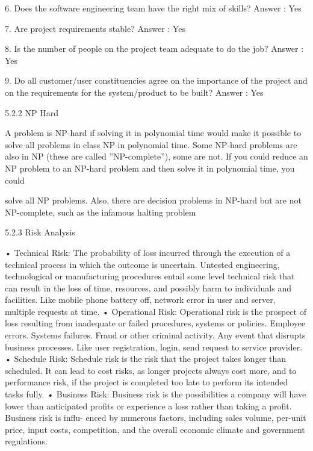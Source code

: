 \documentclass[oneside,a4paper,12pt]{report}
\begin{document}
{6.	Does the software engineering team have the right mix of skills?
Answer : Yes

7.	Are project requirements stable?
Answer : Yes

8.	Is the number of people on the project team adequate to do the job?
Answer : Yes

9.	Do all customer/user constituencies agree on the importance of the project and on the requirements for the system/product to be built?
Answer : Yes

5.2.2	NP Hard

A problem is NP-hard if solving it in polynomial time would make it possible to solve all problems in class NP in polynomial time. Some NP-hard problems are also in NP (these are called ”NP-complete”), some are not. If you could reduce an NP problem to an NP-hard problem and then solve it in polynomial time, you could

solve all NP problems. Also, there are decision problems in NP-hard but are not NP-complete, such as the infamous halting problem

5.2.3	Risk Analysis

•	Technical Risk:
The probability of loss incurred through the execution of a technical process in which the outcome is uncertain. Untested engineering, technological or manufacturing procedures entail some level technical risk that can result in the loss of time, resources, and possibly harm to individuals and facilities. Like mobile phone battery off, network error in user and server, multiple requests at time.
•	Operational Risk:
Operational risk is the prospect of loss resulting from inadequate or failed procedures, systems or policies. Employee errors. Systems failures. Fraud or other criminal activity. Any event that disrupts business processes. Like user registration, login, send request to service provider.
\newline
\newline
•	Schedule Risk:
Schedule risk is the risk that the project takes longer than scheduled. It can lead to cost risks, as longer projects always cost more, and to performance risk, if the project is completed too late to perform its intended tasks fully.
\newline
\newline
•	Business Risk:
Business risk is the possibilities a company will have lower than anticipated profits or experience a loss rather than taking a profit. Business risk is influ- enced by numerous factors, including sales volume, per-unit price, input costs, competition, and the overall economic climate and government regulations.


}
\end{document}
